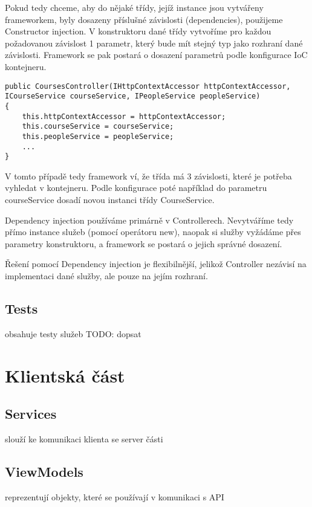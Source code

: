 Pokud tedy chceme, aby do nějaké třídy, jejíž instance jsou vytvářeny frameworkem, byly dosazeny příslušné závislosti (dependencies), použijeme Constructor injection. V konstruktoru dané třídy vytvoříme pro každou požadovanou závislost 1 parametr, který bude mít stejný typ jako rozhraní dané závislosti. Framework se pak postará o dosazení parametrů podle konfigurace IoC kontejneru.

\begin{lstlisting}
public CoursesController(IHttpContextAccessor httpContextAccessor, ICourseService courseService, IPeopleService peopleService)
{
	this.httpContextAccessor = httpContextAccessor;
	this.courseService = courseService;
	this.peopleService = peopleService;
	...
}
\end{lstlisting}
V tomto případě tedy framework ví, že třída má 3 závislosti, které je potřeba vyhledat v kontejneru.
Podle konfigurace poté například do parametru courseService dosadí novou instanci třídy CourseService. 

Dependency injection používáme primárně v Controllerech.
Nevytváříme tedy přímo instance služeb (pomocí operátoru new), naopak si služby vyžádáme přes parametry konstruktoru, a framework se postará o jejich správné dosazení.

Řešení pomocí Dependency injection je flexibilnější, jelikož Controller nezávisí na implementaci dané služby, ale pouze na jejím rozhraní.

\newpage

\subsection{Tests}

obsahuje testy služeb
TODO: dopsat

\section{Klientská část}

\subsection{Services}

slouží ke komunikaci klienta se server části

\subsection{ViewModels}

reprezentují objekty, které se používají v komunikaci s API

